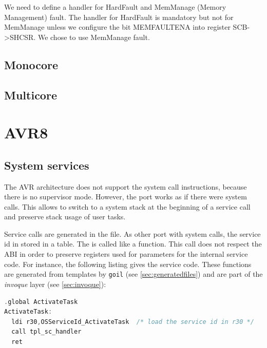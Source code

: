 We need to define a handler for HardFault and MemManage (Memory Management) fault. The handler for HardFault is mandatory but not for MemManage unless we configure the bit MEMFAULTENA into register SCB->SHCSR.
We chose to use MemManage fault.

\subsection{Monocore}

\subsection{Multicore}


\section{AVR8}
\label{sec:avr8port}

\subsection{System services} \label{sec:avr8portSystemService}

The AVR architecture does not support the system call instructions, because there is no supervisor mode. However, the port works as if there were system calls. This allows to switch to a system stack at the beginning of a service call and preserve stack usage of user tasks. 

Service calls are generated in the  file. As other port with system calls, the service id in stored in a table. The  is called like a function. This call does not respect the ABI in order to preserve registers used for parameters for the internal service code. For instance, the following listing gives the  service code. These functions are generated from templates by \texttt{goil} (see \ref{sec:generatedfiles}) and are part of the {\em invoque} layer (see \ref{sec:invoque}):

\begin{lstlisting}[language=C]
  .global ActivateTask
ActivateTask:
  ldi r30,OSServiceId_ActivateTask  /* load the service id in r30 */
  call tpl_sc_handler
  ret
\end{lstlisting}

%


